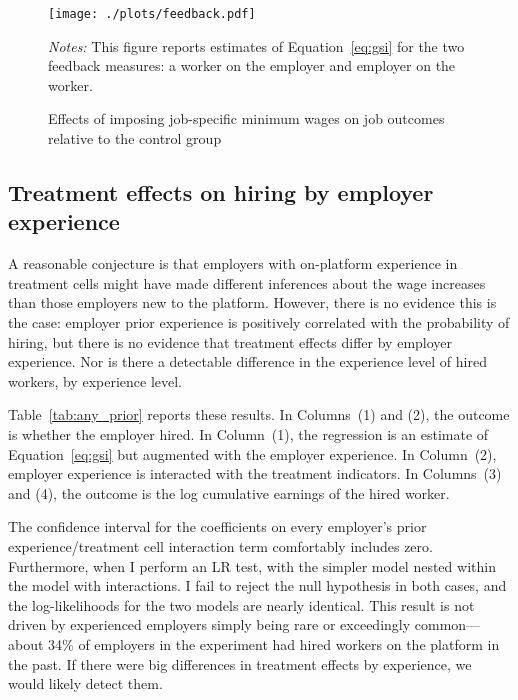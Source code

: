 \documentclass[AER]{AEA}
\begin{document}
\begin{figure}[h!]
  \centering
  \caption{Effects of imposing job-specific minimum wages on job outcomes relative to the control group} \label{fig:all_new_feedback}
  \begin{minipage}{1.15\linewidth}
  \texttt{[image: ./plots/feedback.pdf]}
  \end{minipage}
  \begin{minipage}{0.95\linewidth}
    {\footnotesize
      \emph{Notes:} This figure reports estimates of Equation~\ref{eq:gsi} for the two feedback measures: a worker on the employer and employer on the worker. 
    }
\end{minipage} 
\end{figure} 

% 
%


\subsection{Treatment effects on hiring by employer experience} \label{sec:employer_experience}

A reasonable conjecture is that employers with on-platform experience in treatment cells might have made different inferences about the wage increases than those employers new to the platform.
However, there is no evidence this is the case:
employer prior experience is positively correlated with the probability of hiring, but there is no evidence that treatment effects differ by employer experience.
Nor is there a detectable difference in the experience level of hired
workers, by experience level.
 
Table~\ref{tab:any_prior} reports these results.
In Columns~(1) and (2), the outcome is whether the employer hired. 
In Column~(1), the regression is an estimate of Equation~\ref{eq:gsi} but augmented with the employer experience.
In Column~(2), employer experience is interacted with the treatment indicators.
In Columns~(3) and (4), the outcome is the log cumulative earnings of the hired worker.



The confidence interval for the coefficients on every employer's prior experience/treatment cell interaction term comfortably includes zero.
Furthermore, when I perform an LR test, with the simpler model nested within the model with interactions.
I fail to reject the null hypothesis in both cases, and the log-likelihoods for the two models are nearly identical.
This result is not driven by experienced employers simply being rare or exceedingly common---about 34\% of employers in the experiment had hired workers on the platform in the past.
If there were big differences in treatment effects by experience, we would likely detect them. 
\end{document}

